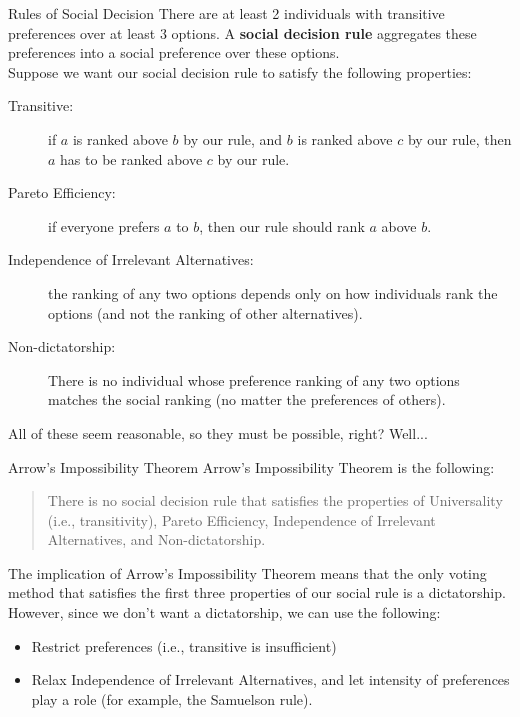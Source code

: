 \documentclass[8pt]{extarticle}
\begin{document}
  \begin{problem}{Rules of Social Decision}
    There are at least 2 individuals with transitive preferences over at least $3$ options. A \textbf{social decision rule} aggregates these preferences into a social preference over these options.\\

    Suppose we want our social decision rule to satisfy the following properties:
    \begin{description}
      \item[Transitive:] if $a$ is ranked above $b$ by our rule, and $b$ is ranked above $c$ by our rule, then $a$ has to be ranked above $c$ by our rule.
      \item[Pareto Efficiency:] if everyone prefers $a$ to $b$, then our rule should rank $a$ above $b$.
      \item[Independence of Irrelevant Alternatives:] the ranking of any two options depends only on how individuals rank the options (and not the ranking of other alternatives).
      \item[Non-dictatorship:] There is no individual whose preference ranking of any two options matches the social ranking (no matter the preferences of others).
    \end{description}
    All of these seem reasonable, so they must be possible, right? Well...
  \end{problem}
  \begin{problem}{Arrow's Impossibility Theorem}
    Arrow's Impossibility Theorem is the following:
    \begin{quote}
        There is no social decision rule that satisfies the properties of Universality (i.e., transitivity), Pareto Efficiency, Independence of Irrelevant Alternatives, and Non-dictatorship.
    \end{quote}
    The implication of Arrow's Impossibility Theorem means that the only voting method that satisfies the first three properties of our social rule is a dictatorship. However, since we don't want a dictatorship, we can use the following:
    \begin{itemize}
      \item Restrict preferences (i.e., transitive is insufficient)
      \item Relax Independence of Irrelevant Alternatives, and let intensity of preferences play a role (for example, the Samuelson rule).
    \end{itemize}
  \end{problem}
\end{document}
